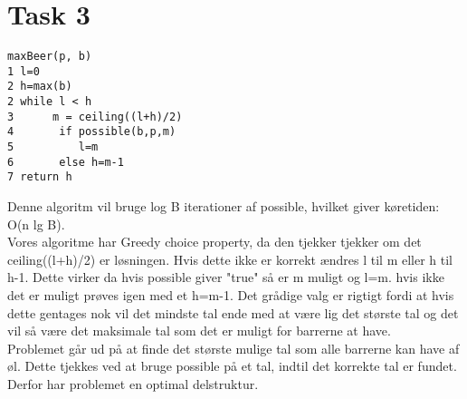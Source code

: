 \documentclass[12pt]{article}
\begin{document}
\section{Task 3}
\begin{verbatim}
maxBeer(p, b)
1 l=0
2 h=max(b)
2 while l < h
3      m = ceiling((l+h)/2)
4       if possible(b,p,m)
5          l=m
6       else h=m-1
7 return h
\end{verbatim}
Denne algoritm vil bruge log B iterationer af possible, hvilket giver køretiden: O(n lg B).\\
Vores algoritme har Greedy choice property, da den tjekker tjekker om det ceiling((l+h)/2) er løsningen. Hvis dette ikke er korrekt ændres l til m eller h til h-1. Dette virker da hvis possible giver "true" så er m muligt og l=m. hvis ikke det er muligt prøves igen med et h=m-1. Det grådige valg er rigtigt fordi at hvis dette gentages nok vil det mindste tal ende med at være lig det største tal og det vil så være det maksimale tal som det er muligt for barrerne at have.\\
Problemet går ud på at finde det største mulige tal som alle barrerne kan have af øl. Dette tjekkes ved at bruge possible på et tal, indtil det korrekte tal er fundet. Derfor har problemet en optimal delstruktur.
\end{document}
